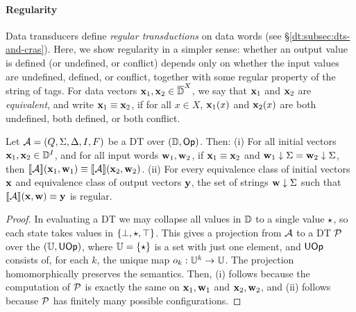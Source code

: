 \paragraph*{Regularity}
\label{dt:subsec:dt-regularity}
Data transducers define \emph{regular transductions} on data words (see \S\ref{dt:subsec:dts-and-cras}). Here, we show regularity in a simpler sense: whether an output value is defined (or undefined, or conflict) depends only on whether the input values are undefined, defined, or conflict, together with some regular property of the string of tags. For data vectors $\textbf{x}_1, \textbf{x}_2 \in {\overline{\mathbb{D}{}}}^X$, we say that $\textbf{x}_1$ and $\textbf{x}_2$ are \emph{equivalent}, and write $\textbf{x}_1 \equiv \textbf{x}_2$, if for all $x \in X$, $\textbf{x}_1(x)$ and $\textbf{x}_2(x)$ are both undefined, both defined, or both conflict.

\begin{theorem}
\label{dt:thm:regular-language}
Let $\mathcal{A} = (Q, \Sigma, \Delta, I, F)$ be a DT over $(\mathbb{D}, \textsf{Op})$. Then:
(i) For all initial vectors $\textbf{x}_1, \textbf{x}_2 \in \mathbb{D}^I$,
and for all input words $\textbf{w}_1, \textbf{w}_2$,
if $\textbf{x}_1 \equiv \textbf{x}_2$ and $\textbf{w}_1 \downarrow \Sigma = \textbf{w}_2 \downarrow \Sigma$,
then $\llbracket \mathcal{A} \rrbracket(\textbf{x}_1,\textbf{w}_1) \equiv \llbracket \mathcal{A} \rrbracket(\textbf{x}_2,\textbf{w}_2)$.
(ii) For every equivalence class of initial vectors $\textbf{x}$ and equivalence class of output vectors $\textbf{y}$, the set of strings $\textbf{w} \downarrow \Sigma$ such that $\llbracket \mathcal{A} \rrbracket(\textbf{x},\textbf{w}) \equiv \textbf{y}$ is regular.
\end{theorem}
\begin{proof}
In evaluating a DT we may collapse all values in $\mathbb{D}$ to a single
value $\star$, so each state takes values in $\{\bot, \star, \top\}$.
This gives a projection from $\mathcal{A}$ to a DT
$\mathcal{P}$ over the  $(\mathbb{U}, \textsf{UOp})$,
where $\mathbb{U} = \{\star\}$ is a set with just one element,
and $\textsf{UOp}$ consists of, for each $k$, the unique
map $o_k : \mathbb{U}^k \to \mathbb{U}$.
The projection homomorphically preserves the semantics.
Then, (i) follows because the computation of $\mathcal{P}$ is exactly the same
on $\textbf{x}_1, \textbf{w}_1$ and $\textbf{x}_2, \textbf{w}_2$, and (ii) follows because $\mathcal{P}$ has finitely many possible configurations.
\end{proof}

